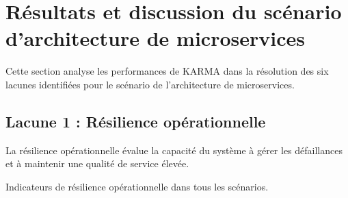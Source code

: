 \section{Résultats et discussion du scénario d'architecture de microservices}\label{sec:results_and_discussion_ms}

Cette section analyse les performances de KARMA dans la résolution des six lacunes identifiées pour le scénario de l'architecture de microservices.

\subsection{Lacune 1 : Résilience opérationnelle}
La résilience opérationnelle évalue la capacité du système à gérer les défaillances et à maintenir une qualité de service élevée.
\begin{table}[h]
  \centering
  \caption{Indicateurs de résilience opérationnelle dans tous les scénarios.}
  \label{tab:operational_resilience}
  \resizebox{\linewidth}{!}{%

}
\end{table}

